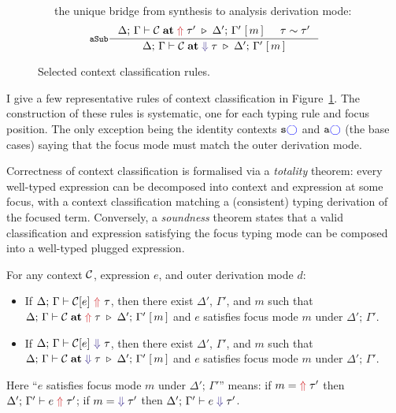 \begin{figure}[p]
\medskip
{}\ \ \ the unique bridge from synthesis to analysis derivation mode:
\[\inference[\texttt{aSub}]{\ctxclass{\C}{{\color{BrickRed}\Uparrow}\;\tau'}{\Delta';\,\Gamma'}{m} & \tau \sim \tau'}{\ctxclass{\C}{{\color{BlueViolet}\Downarrow}\;\tau}{\Delta';\,\Gamma'}{m}}\]
\caption{Selected context classification rules.}
\label{fig:context-classification}
\end{figure}

I give a few representative rules of context classification in Figure~\ref{fig:context-classification}. The construction of these rules is systematic, one for each typing rule and focus position. The only exception being the identity contexts $\texttt{s}{\color{blue}\bigcirc}$ and $\texttt{a}{\color{blue}\bigcirc}$ (the base cases) saying that the focus mode must match the outer derivation mode.

Correctness of context classification is formalised via a \textit{totality} theorem: every well-typed expression can be decomposed into context and expression at some focus, with a context classification matching a (consistent) typing derivation of the focused term. Conversely, a \textit{soundness} theorem states that a valid classification and expression satisfying the focus typing mode can be composed into a well-typed plugged expression.

\begin{majortheorembox}
%
\begin{theorem}\label{thm:plug-decomposition}
For any context $\mathcal{C}$, expression $e$, and outer derivation mode $d$:
\begin{itemize}
\item If\/ $\synthesis{\C[e]}{\tau}$, then there exist $\Delta'$, $\Gamma'$, and $m$ such that $\ctxclass{\C}{{\color{BrickRed}\Uparrow}\;\tau}{\Delta';\,\Gamma'}{m}$ and $e$ satisfies focus mode $m$ under $\Delta';\,\Gamma'$.
\item If\/ $\analysis{\C[e]}{\tau}$, then there exist $\Delta'$, $\Gamma'$, and $m$ such that $\ctxclass{\C}{{\color{BlueViolet}\Downarrow}\;\tau}{\Delta';\,\Gamma'}{m}$ and $e$ satisfies focus mode $m$ under $\Delta';\,\Gamma'$.
\end{itemize}
Here ``$e$ satisfies focus mode $m$ under $\Delta';\,\Gamma'$'' means: if $m = {\color{BrickRed}\Uparrow}\;\tau'$ then $\Delta';\,\Gamma' \vdash e\;{\color{BrickRed}\Uparrow}\;\tau'$; if $m = {\color{BlueViolet}\Downarrow}\;\tau'$ then $\Delta';\,\Gamma' \vdash e\;{\color{BlueViolet}\Downarrow}\;\tau'$.
\end{theorem}
\end{majortheorembox}

